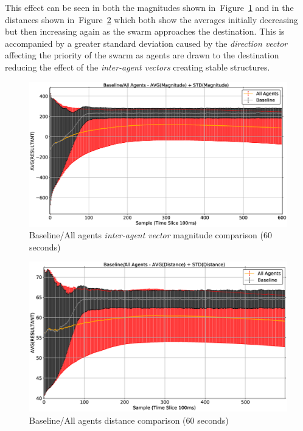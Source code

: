 This effect can be seen in both the magnitudes shown in~Figure~\ref{reduced:BaselineAllAgentsMag2} and in the distances shown in~Figure~\ref{reduced:BaselineAllAgentsDist2} which both show the averages initially decreasing but then increasing again as the swarm approaches the destination. This is accompanied by a greater standard deviation caused by the \textit{direction vector} affecting the priority of the swarm as agents are drawn to the destination reducing the effect of the \textit{inter-agent vectors} creating stable structures.
\begin{figure}[H]
\begin{center}
\includegraphics[width=14cm]{CHAPTER-6/figures/BaselineAllAgentsMag2}
\end{center}
\caption[Baseline/All agents magnitude comparison]{Baseline/All agents \textit{inter-agent vector} magnitude comparison (60 seconds)\label{reduced:BaselineAllAgentsMag2}}
\end{figure}
\begin{figure}[H]
\begin{center}
\includegraphics[width=14cm]{CHAPTER-6/figures/BaselineAllAgentsDist2}
\end{center}
\caption{Baseline/All agents distance comparison (60 seconds)\label{reduced:BaselineAllAgentsDist2}}
\end{figure}

